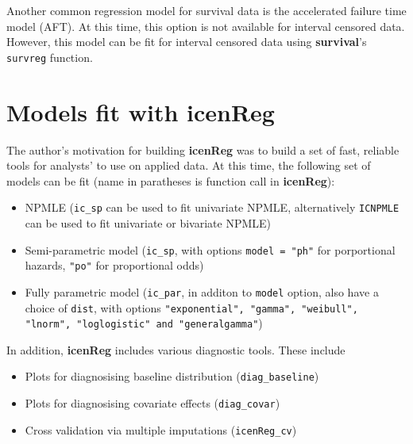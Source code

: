 \documentclass[11pt]{report}
\begin{document}
  Another common regression model for survival data is the accelerated failure time model (AFT).
  At this time, this option is not available for interval censored data. However, this model
  can be fit for interval censored data using {\bf survival}'s \texttt{survreg} function. 
  
\section{Models fit with {\bf{icenReg}} }

  The author's motivation for building {\bf{icenReg}} was to build a set of fast, reliable
  tools for analysts' to use on applied data. At this time, the following set of models can 
  be fit (name in paratheses is function call in {\bf{icenReg}}):
  
  \begin{itemize}
  
    \item NPMLE (\texttt{ic\_sp} can be used to fit univariate NPMLE, alternatively \texttt{ICNPMLE} can be used to fit univariate or bivariate NPMLE)
  
    \item Semi-parametric model (\texttt{ic\_sp}, with options \texttt{model = "ph"} for 
    porportional hazards, \texttt{"po"} for proportional odds)
    
    \item Fully parametric model (\texttt{ic\_par}, in additon to \texttt{model} option, also 
    have a choice of \texttt{dist}, with options \texttt{"exponential", "gamma", "weibull", "lnorm", "loglogistic" and "generalgamma"})
  
  \end{itemize}
  
  In addition, {\bf{icenReg}} includes various diagnostic tools. These include
  
  \begin{itemize}
  
    \item Plots for diagnosising baseline distribution (\texttt{diag\_baseline})
    
    \item Plots for diagnosising covariate effects (\texttt{diag\_covar})
    
    \item Cross validation via multiple imputations (\texttt{icenReg\_cv})
  
  \end{itemize}
  
\end{document}

